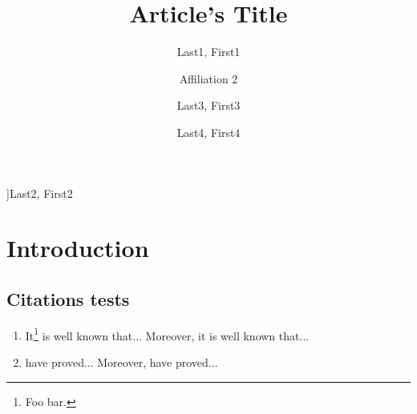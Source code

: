 \documentclass[
]{nwejmart}
\begin{document}
%
\title{Article's Title}
%
%
\author[affiliation={Affiliation 1}]{Last1, First1}
\author[affiliation=[aff2]{Affiliation 2}]{Last2, First2}
\author[affiliation={Affiliation 3},affiliation={Affiliation 3 bis}]{Last3, First3}
\author[affiliation={Affiliation 4},affiliationtagged={aff2}]{Last4, First4}
%
\begin{abstract}
  \lipsum[1]
\end{abstract}
%
%
%
\maketitle
%
%
\section*{Introduction}
%
\subsection{Citations tests}
%
\begin{enumerate}
\item It\footnote{Foo bar.} is well known\autocite{baez/article}
  that... Moreover, it is well known\autocite{companion} that...
\item \textcite{baez/article} have proved... Moreover, \textcite{companion}
  have proved...
\end{enumerate}
%
\end{document}

